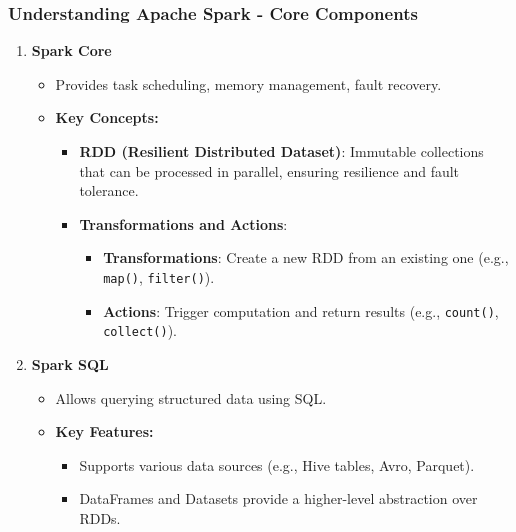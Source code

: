 \documentclass{beamer}
\begin{document}
\begin{frame}[fragile]
    \frametitle{Understanding Apache Spark - Core Components}
    \begin{enumerate}
        \item \textbf{Spark Core}
        \begin{itemize}
            \item Provides task scheduling, memory management, fault recovery.
            \item \textbf{Key Concepts:}
            \begin{itemize}
                \item \textbf{RDD (Resilient Distributed Dataset)}: Immutable collections that can be processed in parallel, ensuring resilience and fault tolerance.
                \item \textbf{Transformations and Actions}:
                \begin{itemize}
                    \item \textbf{Transformations}: Create a new RDD from an existing one (e.g., \texttt{map()}, \texttt{filter()}).
                    \item \textbf{Actions}: Trigger computation and return results (e.g., \texttt{count()}, \texttt{collect()}).
                \end{itemize}
            \end{itemize}
        \end{itemize}

        \item \textbf{Spark SQL}
        \begin{itemize}
            \item Allows querying structured data using SQL.
            \item \textbf{Key Features:}
            \begin{itemize}
                \item Supports various data sources (e.g., Hive tables, Avro, Parquet).
                \item DataFrames and Datasets provide a higher-level abstraction over RDDs.
            \end{itemize}
        \end{itemize}
    \end{enumerate}
\end{frame}
\end{document}

